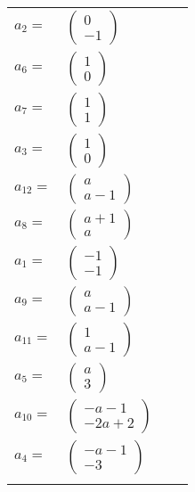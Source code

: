 \documentclass[1p]{elsarticle_modified}
\theoremstyle{definition}
\begin{document}
\begin{tabular}{m{7pt} m{180pt} m{7pt} m{180pt} }
\flushright $a_{2}=$&$\begin{pmatrix}0\\-1\end{pmatrix}$ \\
\flushright $a_{6}=$&$\begin{pmatrix}1\\0\end{pmatrix}$ \\
\flushright $a_{7}=$&$\begin{pmatrix}1\\1\end{pmatrix}$ \\
\flushright $a_{3}=$&$\begin{pmatrix}1\\0\end{pmatrix}$ \\
\flushright $a_{12}=$&$\begin{pmatrix}a\\a-1\end{pmatrix}$ \\
\flushright $a_{8}=$&$\begin{pmatrix}a+1\\a\end{pmatrix}$ \\
\flushright $a_{1}=$&$\begin{pmatrix}-1\\-1\end{pmatrix}$ \\
\flushright $a_{9}=$&$\begin{pmatrix}a\\a-1\end{pmatrix}$ \\
\flushright $a_{11}=$&$\begin{pmatrix}1\\a-1\end{pmatrix}$ \\
\flushright $a_{5}=$&$\begin{pmatrix}a\\3\end{pmatrix}$ \\
\flushright $a_{10}=$&$\begin{pmatrix}- a-1\\-2 a+2\end{pmatrix}$ \\
\flushright $a_{4}=$&$\begin{pmatrix}- a-1\\-3\end{pmatrix}$\\&\end{tabular}
\end{document}
